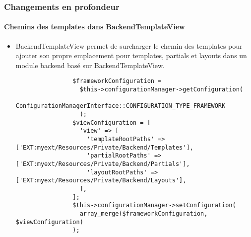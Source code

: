 \begin{frame}[fragile]
	\frametitle{Changements en profondeur}
	\framesubtitle{Chemins des templates dans BackendTemplateView}

	\lstset{basicstyle=\tiny\ttfamily}

	\begin{itemize}
		\item BackendTemplateView permet de surcharger le chemin des templates pour ajouter son
			propre emplacement pour templates, partials et layouts dans un module backend basé
			sur BackendTemplateView.

			\begin{lstlisting}
				$frameworkConfiguration =
				  $this->configurationManager->getConfiguration(
				    ConfigurationManagerInterface::CONFIGURATION_TYPE_FRAMEWORK
				  );
				$viewConfiguration = [
				  'view' => [
				    'templateRootPaths' => ['EXT:myext/Resources/Private/Backend/Templates'],
				    'partialRootPaths' => ['EXT:myext/Resources/Private/Backend/Partials'],
				    'layoutRootPaths' => ['EXT:myext/Resources/Private/Backend/Layouts'],
				  ],
				];
				$this->configurationManager->setConfiguration(
				  array_merge($frameworkConfiguration, $viewConfiguration)
				);
			\end{lstlisting}

	\end{itemize}

\end{frame}


